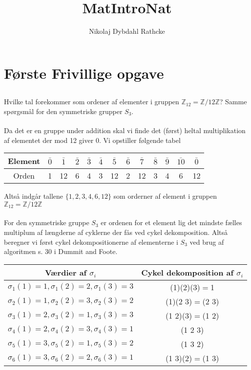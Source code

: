 \documentclass[12pt]{article}
\title{MatIntroNat}
\author{Nikolaj Dybdahl Rathcke}
\begin{document}
\section{Første Frivillige opgave}

\subsection{}
Hvilke tal forekommer som ordener af elementer i gruppen $\mathbb{Z}_{12}=\mathbb{Z}/12\mathbb{Z}$? Samme spørgsmål for den symmetriske grupper $S_3$.\\
\\
Da det er en gruppe under addition skal vi finde det (først) heltal multiplikation af elementet der mod 12 giver 0. Vi opstiller følgende tabel\\
\begin{center}
\begin{tabular}{c|c|c|c|c|c|c|c|c|c|c|c|c}
Element & $\bar{0}$ & $\bar{1}$ & $\bar{2}$ & $\bar{3}$ & $\bar{4}$ & $\bar{5}$ & $\bar{6}$ & $\bar{7}$ & $\bar{8}$ & $\bar{9}$ & $\bar{10}$ & $\bar{0}$ \\ 
\hline 
Orden & 1 & 12 & 6 & 4 & 3 & 12 & 2 & 12 & 3 & 4 & 6 & 12 \\ 
\end{tabular}
\end{center}
Altså indgår tallene $\{1,2,3,4,6,12\}$ som orderner af element i gruppen $\mathbb{Z}_{12}=\mathbb{Z}/12\mathbb{Z}$\\
\\
For den symmetriske gruppe $S_3$ er ordenen for et element lig det mindste fælles multiplum af længderne af cyklerne der fås ved cykel dekomposition. Altså beregner vi først cykel dekompositionerne af elementerne i $S_3$ ved brug af algoritmen s. 30 i Dummit and Foote.\\
\begin{center}
\begin{tabular}{|c|c|}
\hline 
Værdier af $\sigma_i$ & Cykel dekomposition af $\sigma_i$ \\ 
\hline 
$\sigma_1(1)=1,\sigma_1(2)=2,\sigma_1(3)=3$  & (1)(2)(3)$=$1 \\  
$\sigma_2(1)=1,\sigma_2(2)=3,\sigma_2(3)=2$  & (1)(2 3)$=$(2 3) \\ 
$\sigma_3(1)=2,\sigma_3(2)=1,\sigma_3(3)=3$  & (1 2)(3)$=$(1 2) \\ 
$\sigma_4(1)=2,\sigma_4(2)=3,\sigma_4(3)=1$  & (1 2 3) \\ 
$\sigma_5(1)=3,\sigma_5(2)=1,\sigma_5(3)=2$  & (1 3 2) \\ 
$\sigma_6(1)=3,\sigma_6(2)=2,\sigma_6(3)=1$  & (1 3)(2)$=$(1 3) \\ 
\hline
\end{tabular} 
\end{center}
\end{document}
